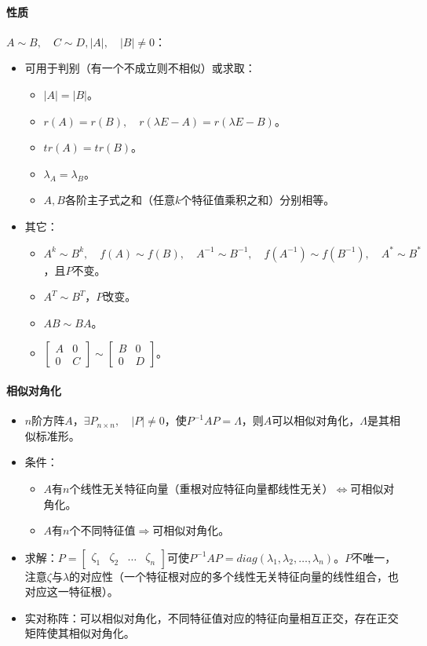 \documentclass[
12pt, %
a4paper, 
oneside, %
]{scrartcl}
\begin{document}
\paragraph{性质}
$ A \sim B, \quad C \sim D, |A|, \quad  |B| \neq 0 $：
\begin{itemize}
\item 可用于判别（有一个不成立则不相似）或求取：
\begin{itemize}
\item $ |A| = |B| $。
\item $ r(A) = r(B), \quad r(\lambda E - A) = r(\lambda E - B) $。
\item $ tr(A) = tr(B) $。
\item $ \lambda_A = \lambda_B $。
\item $ A, B $各阶主子式之和（任意$ k $个特征值乘积之和）分别相等。
\end{itemize}
\item 其它：
\begin{itemize}
\item $ A^k \sim B^k, \quad f(A) \sim f(B), \quad A^{-1} \sim B^{-1}, \quad f(A^{-1}) \sim f(B^{-1}), \quad A^* \sim B^* $，且$ P $不变。
\item $ A^T \sim B^T $，$ P $改变。
\item $ AB \sim BA $。
\item $ \begin{bmatrix} A & 0 \\ 0 & C \end{bmatrix} \sim \begin{bmatrix} B & 0 \\ 0 & D \end{bmatrix} $。
\end{itemize} 
\end{itemize}
\paragraph{相似对角化}
\begin{itemize}
\item $ n $阶方阵$ A $，$ \exists P_{n \times n}, \quad |P| \neq 0 $，使$ P^{-1} AP = \Lambda $，则$ A $可以相似对角化，$ \Lambda $是其相似标准形。
\item 条件：
\begin{itemize}
\item $ A $有$ n $个线性无关特征向量（重根对应特征向量都线性无关）$ \Leftrightarrow $可相似对角化。
\item $ A $有$ n $个不同特征值$ \Rightarrow $可相似对角化。
\end{itemize} 
\item 求解：$ P = \begin{bmatrix} \zeta_1 & \zeta_2 & \dots & \zeta_n \end{bmatrix} $可使$ P^{-1} AP = diag(\lambda_1, \lambda_2, \dots ,\lambda_n) $。$ P $不唯一，注意$ \zeta $与$ \lambda $的对应性（一个特征根对应的多个线性无关特征向量的线性组合，也对应这一特征根）。
\item 实对称阵：可以相似对角化，不同特征值对应的特征向量相互正交，存在正交矩阵使其相似对角化。
\end{itemize} 
\end{document}
